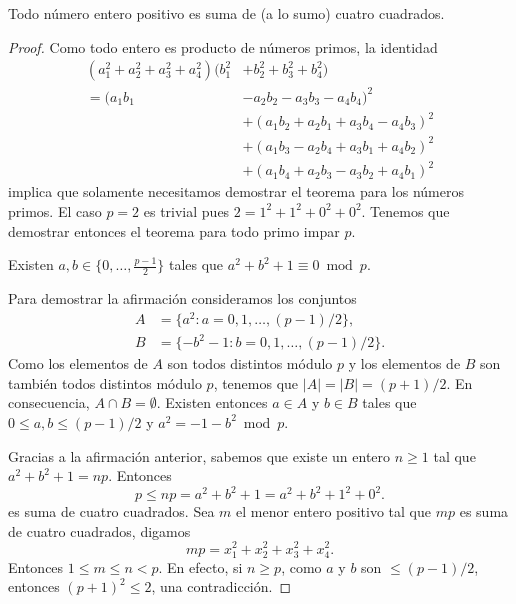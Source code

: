 \begin{theorem}[Lagrange]
	\label{thm:Lagrange}
	Todo número entero positivo es suma de (a lo sumo) cuatro cuadrados.	
\end{theorem}

\begin{proof}
	Como todo entero es producto de números primos, 
	la identidad 
	\begin{equation}
		\begin{aligned}
			\label{eq:Euler}
			(a_1^2+a_2^2+a_3^2+a_4^2)(b_1^2&+b_2^2+b_3^2+b_4^2)\\
			=(a_1 b_1 &- a_2 b_2 - a_3 b_3 - a_4 b_4)^2\\
			&+(a_1 b_2 + a_2 b_1 + a_3 b_4 - a_4 b_3)^2\\
			&+(a_1 b_3 - a_2 b_4 + a_3 b_1 + a_4 b_2)^2\\
			&+(a_1 b_4 + a_2 b_3 - a_3 b_2 + a_4 b_1)^2
		\end{aligned}
	\end{equation}
	implica que solamente necesitamos demostrar el teorema para los números
	primos. El caso $p=2$ es trivial pues $2=1^2+1^2+0^2+0^2$. Tenemos que
	demostrar entonces el teorema para todo primo impar $p$. 

	\begin{claim}
		Existen $a,b\in\{0,\dots,\frac{p-1}{2}\}$ tales que
		$a^2+b^2+1\equiv0\bmod{p}$. 
	\end{claim}

	Para demostrar la afirmación consideramos los conjuntos 
	\begin{align*}
		A&=\{a^2:a=0,1,\dots,(p-1)/2\},\\
		B&=\{-b^2-1:b=0,1,\dots,(p-1)/2\}.
	\end{align*}
	Como los elementos de $A$ son todos distintos módulo $p$ y los elementos de
	$B$ son también todos distintos módulo $p$, tenemos que $|A|=|B|=(p+1)/2$.
	En consecuencia, $A\cap B=\emptyset$. Existen entonces $a\in A$ y $b\in B$
	tales que $0\leq a,b\leq (p-1)/2$ y $a^2=-1-b^2\bmod p$.

	\medskip
	Gracias a la afirmación anterior, sabemos que existe un entero $n\geq1$ tal
	que $a^2+b^2+1=np$. Entonces
	\[
		p\leq np=a^2+b^2+1=a^2+b^2+1^2+0^2.
	\]
	es suma de cuatro cuadrados. Sea $m$ el menor entero positivo tal que $mp$
	es suma de cuatro cuadrados, digamos
	\[
		mp=x_1^2+x_2^2+x_3^2+x_4^2.
	\]
	Entonces $1\leq m\leq n<p$. En efecto, si $n\geq p$, como $a$ y $b$ son
	$\leq(p-1)/2$, entonces $(p+1)^2\leq 2$, una contradicción. 


\end{proof}
